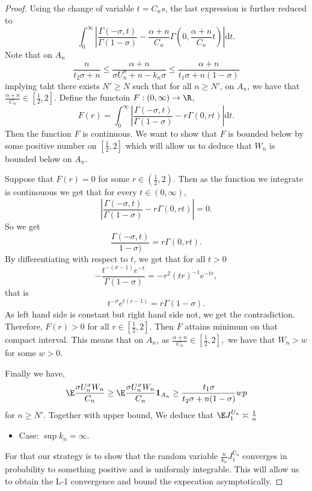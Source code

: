 \begin{proof}
    Using the change of variable $t = C_ns$, the last expression is further reduced to 
    \[
    \int_0^\infty \left| \frac{\Gamma(-\sigma, t)}{\Gamma(1-\sigma)}- \frac{\alpha + n}{C_n}\Gamma\left( 0, \frac{\alpha + n}{C_n}t\right)\right|\mathrm{d}t.
    \]
    Note that on $A_n$
    \[
    \frac{n}{t_2\sigma + n}\leq \frac{\alpha + n}{\sigma U_n^\sigma + n - k_n \sigma} \leq \frac{\alpha + n}{t_1 \sigma + n(1-\sigma)}
    \]
    implying taht there exists $N' \geq N$ such that for all $n \geq N'$, on $A_n$, we have that $\frac{\alpha + n}{C_n} \in \left[\frac{1}{2},2\right].$
    Define the functoin $F : (0,\infty) \to \R$,
    \[
    F(r) = \int_0^\infty \left| \frac{\Gamma(-\sigma, t)}{\Gamma(1-\sigma)}- r\Gamma\left( 0, rt\right)\right|\mathrm{d}t.
    \]
    Then the function $F$ is continuous. We want to show that $F$ is bounded below by some positive number on $\left[\frac{1}{2},2\right]$ which will allow us to deduce that $W_n$ is bounded below on $A_n.$

    Suppose that $F(r) = 0$ for some $r \in  \left(\frac{1}{2}, 2\right).$ Then as the function we integrate is continouous we get that  for every $t \in (0,\infty)$,
    \[
    \left| \frac{\Gamma(-\sigma, t)}{\Gamma(1-\sigma)}- r\Gamma\left( 0, rt\right)\right| = 0.
    \]
    So we get 
    \[
    \frac{\Gamma(-\sigma, t)}{1-\sigma)} = r \Gamma(0, rt).
    \]
    By differentiating with respect to $t$, we get that for all $t >0$
    \[
    -\frac{t^{-(\sigma-1)}e^{-t}}{\Gamma(1-\sigma)} = -r^2 (tr)^{-1}e^{-tr},
    \]
    that is
    \[
    t^{-\sigma}e^{t(r-1)} = r\Gamma(1-\sigma).
    \]
    As left hand side is constant but right hand side not, we get the contradiction. Therefore, $F(r) > 0$ for all $r \in \left[\frac{1}{2},2\right].$ Then $F$ attains minimum on that compact interval. This means that on $A_n$, as $\frac{\alpha + n}{C_n} \in \left[\frac{1}{2},2\right],$ we have that $W_n > w$ for some $w > 0.$    

    Finally we have,
    \[
    \E \frac{\sigma U_n^\sigma W_n}{C_n} \geq \E \frac{\sigma U_n^\sigma W_n}{C_n}\mathbf{1}_{A_n} \geq \frac{t_1 \sigma}{t_2 \sigma + n(1-\sigma)}w p 
    \]
    for  $n \geq N'.$ Together with upper bound, We deduce that $\E J_1^{U_n} \asymp \frac{1}{n} $

    \begin{itemize}
        \item Case: $\sup k_n = \infty.$
    \end{itemize}
    For that our strategy is to show that the random variable $\frac{n}{k_n}J_1^{U_n}$ converges in probability to something positive and is uniformly integrable. This will allow us to obtain the L-1 convergence and bound the expecation asymptotically. 


\end{proof}
